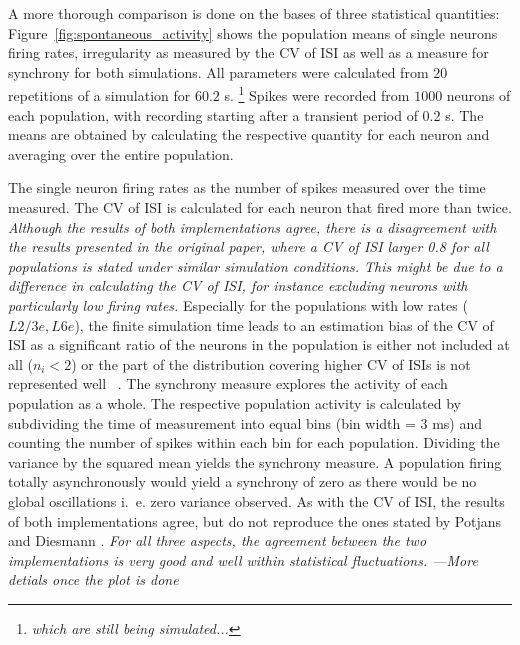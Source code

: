 A more thorough comparison is done on the bases of three statistical quantities: 
Figure~\ref{fig:spontaneous_activity} shows the population means of single neurons firing rates, 
irregularity as measured by  the CV of ISI as well as a measure for synchrony for both 
simulations. All parameters were calculated from $20$ repetitions of a simulation for 
$60.2$ s.%
\footnote{\emph{which are still being simulated...}}
Spikes were recorded from $1000$ neurons of each population, with recording 
starting after a transient period of $0.2$ s. 
The means are obtained by calculating the respective quantity for each neuron and averaging over 
the entire population. 

The single neuron firing rates as 
the number of spikes measured over the time measured.
The CV of ISI is calculated for each neuron that fired more than twice.
\emph{
Although the results of both implementations agree, there is a disagreement with the results presented 
in the original paper, where a CV of ISI larger 0.8 for all populations is stated
under similar simulation conditions\cite{potjans2014}. 
This might be due to a difference in calculating the CV of ISI, for instance excluding neurons 
with particularly low firing rates. }
Especially 
for the populations with low rates ($L2/3e, L6e$), the finite simulation time leads to an estimation bias
of the CV of ISI as a significant ratio of the neurons in the population is either not included at all 
($n_i < 2$) or the part of the distribution covering higher CV of ISIs is not represented well~%
\cite{grun2010analysis}. 
The synchrony measure explores the activity of each population as a whole. The respective population
activity is calculated by subdividing the time of measurement into equal bins (bin width = $3$ ms) 
and counting the number of spikes within each bin for each population. 
Dividing the variance by the squared mean yields the synchrony measure. 
A population firing totally asynchronously would yield a synchrony of zero as there would 
be no global oscillations i.~e. zero variance observed.
As with the CV of ISI, the results of both implementations agree, but do not reproduce the ones stated 
by Potjans and Diesmann \cite{potjans2014}. 
\emph{For all three aspects, the agreement between the two implementations is very good 
and well within statistical fluctuations. ---More detials once the plot is done}

